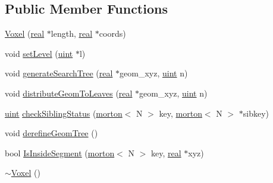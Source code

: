 \subsection*{Public Member Functions}
\begin{DoxyCompactItemize}
\item 
\mbox{\hyperlink{classVoxel_a2de5f4a796b6232664726a75cc727873}{Voxel}} (\mbox{\hyperlink{definitions_8h_aedc0ad84d1e764530814f57ad931d02a}{real}} $\ast$length, \mbox{\hyperlink{definitions_8h_aedc0ad84d1e764530814f57ad931d02a}{real}} $\ast$coords)
\item 
void \mbox{\hyperlink{classVoxel_af363467297ff56e7f67c8b8e433fba04}{set\+Level}} (\mbox{\hyperlink{definitions_8h_a69aa29b598b851b0640aa225a9e5d61d}{uint}} $\ast$l)
\item 
void \mbox{\hyperlink{classVoxel_acf4017ddfe4ecfb418cd4c8828eec71d}{generate\+Search\+Tree}} (\mbox{\hyperlink{definitions_8h_aedc0ad84d1e764530814f57ad931d02a}{real}} $\ast$geom\+\_\+xyz, \mbox{\hyperlink{definitions_8h_a69aa29b598b851b0640aa225a9e5d61d}{uint}} n)
\item 
void \mbox{\hyperlink{classVoxel_a97154e50e16297f2f9e81cac91271aee}{distribute\+Geom\+To\+Leaves}} (\mbox{\hyperlink{definitions_8h_aedc0ad84d1e764530814f57ad931d02a}{real}} $\ast$geom\+\_\+xyz, \mbox{\hyperlink{definitions_8h_a69aa29b598b851b0640aa225a9e5d61d}{uint}} n)
\item 
\mbox{\hyperlink{definitions_8h_a69aa29b598b851b0640aa225a9e5d61d}{uint}} \mbox{\hyperlink{classVoxel_a3f219470ab58fc5da5431566fd093378}{check\+Sibling\+Status}} (\mbox{\hyperlink{definitions_8h_af8682350bd8bb38ee9023f7a0a310add}{morton}}$<$ N $>$ key, \mbox{\hyperlink{definitions_8h_af8682350bd8bb38ee9023f7a0a310add}{morton}}$<$ N $>$ $\ast$sibkey)
\item 
void \mbox{\hyperlink{classVoxel_ad34c50e8ed627e20dba6188a1c074854}{derefine\+Geom\+Tree}} ()
\item 
bool \mbox{\hyperlink{classVoxel_af2e7050a3c6d74c62c929d6b08f123b3}{Is\+Inside\+Segment}} (\mbox{\hyperlink{definitions_8h_af8682350bd8bb38ee9023f7a0a310add}{morton}}$<$ N $>$ key, \mbox{\hyperlink{definitions_8h_aedc0ad84d1e764530814f57ad931d02a}{real}} $\ast$xyz)
\item 
\mbox{\hyperlink{classVoxel_a4e96d3d825885a1728f478bba74cd3c9}{$\sim$\+Voxel}} ()
\end{DoxyCompactItemize}
